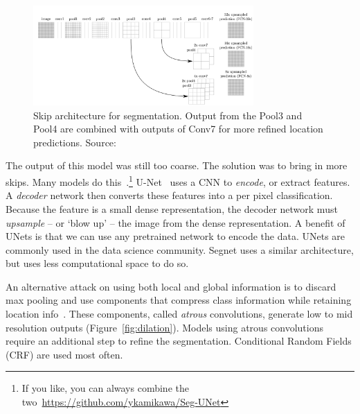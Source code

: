 \documentclass[12pt, a4paper, oneside, headinclude, footinclude]{article}
\begin{document}
\begin{figure}
    \centering
\includegraphics[width=0.75\textwidth]{Figures/skip-segmentation.png}
    \caption[Skip architecture for segmentation]{Skip architecture for
    segmentation. Output from the Pool3 and Pool4 are combined with outputs of
    Conv7 for more refined location predictions.
    Source:~\cite{long2015fully}\label{fig:skipsegmo}}
\end{figure}

The output of this model was still too coarse. The solution was to bring in more
skips. Many models do this~\cite{segnet, unet}.\footnote{If you like, you can
always combine the two~\url{https://github.com/ykamikawa/Seg-UNet}}
U-Net~\cite{unet} uses a CNN to \textit{encode}, or extract features. A
\textit{decoder} network then converts these features into a per pixel
classification. Because the feature is a small dense representation, the
decoder network must \textit{upsample} -- or `blow up' -- the image from the
dense representation. A benefit of UNets is that we can use any pretrained
network to encode the data. UNets are commonly used in the data science
community. Segnet uses a similar architecture, but uses less computational
space to do so.

An alternative attack on using both local and global information is to discard
max pooling and use components that compress class information while retaining
location info~\cite{chen2018,dilated2017}. These components, called
\textit{atrous} convolutions, generate low to mid resolution outputs
(Figure~\ref{fig:dilation}).  Models using atrous convolutions require an
additional step to refine the segmentation. Conditional Random Fields (CRF)
are used most often.
\end{document}
